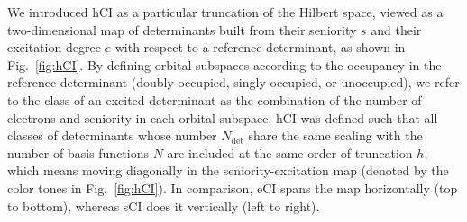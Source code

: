 \documentclass[aip,jcp,reprint,noshowkeys,superscriptaddress]{revtex4-1}
\newcommand{\Ndet}{N_\text{det}}
\begin{document}
We introduced hCI \cite{Kossoski_2022} as a particular truncation of the Hilbert space,
viewed as a two-dimensional map of determinants built from their seniority $s$ and their excitation degree $e$ with respect to a reference determinant, as shown in Fig.~\ref{fig:hCI}.
By defining orbital subspaces according to the occupancy in the reference determinant (doubly-occupied, singly-occupied, or unoccupied),
we refer to the class of an excited determinant as the combination of the number of electrons and seniority in each orbital subspace.
hCI was defined such that all classes of determinants whose number $\Ndet$ share the same scaling with the number of basis functions $N$ are included at the same order of truncation $h$,
which means moving diagonally in the seniority-excitation map (denoted by the color tones in Fig.~\ref{fig:hCI}).
In comparison, eCI spans the map horizontally (top to bottom), whereas sCI does it vertically (left to right).
\end{document}
